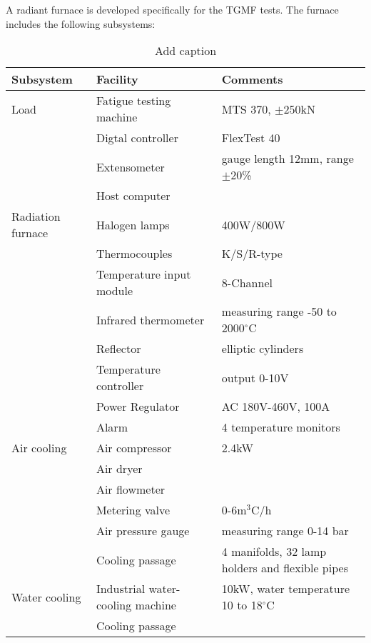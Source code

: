 A radiant furnace is developed specifically for the TGMF tests.
The furnace includes the following subsystems:
\begin{table}[htbp]
  \centering
  \caption{Add caption}
    \begin{tabular}{p{4cm}p{5cm}p{5cm}}
    \toprule
    Subsystem & Facility & Comments \\
    \midrule
    Load  & Fatigue testing machine & MTS 370, $\pm$250kN \\
          & Digtal controller & FlexTest 40 \\
          & Extensometer & gauge length 12mm, range $\pm$20\% \\
          & Host computer &  \\
    Radiation furnace & Halogen lamps & 400W/800W \\
          & Thermocouples & K/S/R-type \\
          & Temperature input module & 8-Channel \\
          & Infrared thermometer & measuring range -50 to 2000$^\circ$C \\
          & Reflector & elliptic cylinders \\
          & Temperature controller & output 0-10V \\
          & Power Regulator & AC 180V-460V, 100A \\
          & Alarm & 4 temperature monitors \\
    Air cooling & Air compressor & 2.4kW \\
          & Air dryer &  \\
          & Air flowmeter &  \\
          & Metering valve & 0-6m$^3$C/h \\
          & Air pressure gauge & measuring range 0-14 bar \\
          & Cooling passage & 4 manifolds, 32 lamp holders and flexible pipes \\
    Water cooling & Industrial water-cooling machine & 10kW, water temperature 10 to 18$^\circ$C \\
          & Cooling passage &  \\
    \bottomrule
    \end{tabular}%
  \label{tab:addlabel}%
\end{table}%

